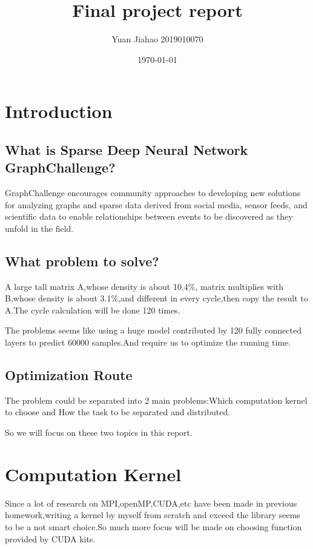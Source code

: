\documentclass[12pt]{scrartcl} %
\title{	
	Final project report
}
\author{Yuan Jiahao 2019010070} %
\date{\normalsize\today} %
\begin{document}
\maketitle %


\section{Introduction}
\subsection{What is Sparse Deep Neural Network GraphChallenge?}
GraphChallenge encourages community approaches to developing new solutions for analyzing graphs and sparse data derived from social media, sensor feeds, and scientific data to enable relationships between events to be discovered as they unfold in the field.
\subsection{What problem to solve?}
A large tall matrix A,whose density is about 10.4\%, matrix multiplies with B,whose density is about 3.1\%,and different in every cycle,then copy the result to A.The cycle calculation will be done 120 times.

The problems seems like using a huge model contributed by 120 fully connected layers to predict 60000 samples.And require us to optimize the running time.
\subsection{Optimization Route}
The problem could be separated into 2 main problems:Which computation kernel to choose and How the task to be separated and distributed.

So we will focus on these two topics in this report.
\section{Computation Kernel}
Since a lot of research on MPI,openMP,CUDA,etc have been made in previous homework,writing a kernel by myself from scratch and exceed the library seems to be a not smart choice.So much more focus will be made on choosing function provided by CUDA kits.
\end{document}

